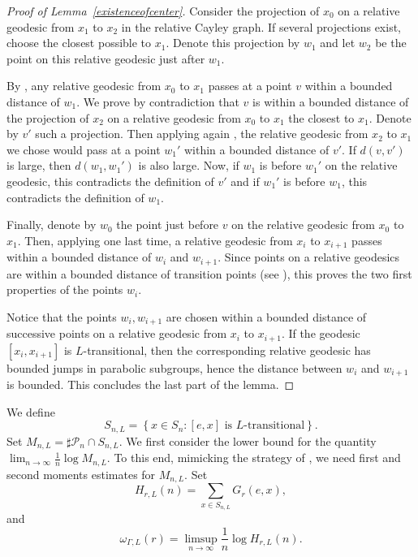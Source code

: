\documentclass{amsart}
\theoremstyle{definition}
\theoremstyle{remark}
\begin{document}
\begin{proof}[Proof of Lemma~\ref{existenceofcenter}]
Consider the projection of $x_0$ on a relative geodesic from $x_1$ to $x_2$ in the relative Cayley graph.
If several projections exist, choose the closest possible to $x_1$.
Denote this projection by $w_1$ and
let $w_2$ be the point on this relative geodesic just after $w_1$.

By \cite[Lemma~4.16]{DussauleLLT1}, any relative geodesic from $x_0$ to $x_1$ passes at a point $v$ within a bounded distance of $w_1$.
We prove by contradiction that $v$ is within a bounded distance of the projection of $x_2$ on a relative geodesic from $x_0$ to $x_1$ the closest to $x_1$.
Denote by $v'$ such a projection.
Then applying again \cite[Lemma~4.16]{DussauleLLT1}, the relative geodesic from $x_2$ to $x_1$ we chose would pass at a point $w_1'$ within a bounded distance of $v'$.
If $d(v,v')$ is large, then $d(w_1,w_1')$ is also large.
Now, if $w_1$ is before $w_1'$ on the relative geodesic, this contradicts the definition of $v'$ and if $w_1'$ is before $w_1$, this contradicts the definition of $w_1$.

Finally, denote by $w_0$ the point just before $v$ on the relative geodesic from $x_0$ to $x_1$.
Then, applying \cite[Lemma~4.16]{DussauleLLT1} one last time, a relative geodesic from $x_i$ to $x_{i+1}$ passes within a bounded distance of $w_i$ and $w_{i+1}$.
Since points on a relative geodesics are within a bounded distance of transition points (see \cite[Proposition~8.13]{Hruska}), this proves the two first properties of the points $w_i$.

Notice that the points $w_i,w_{i+1}$ are chosen within a bounded distance of successive points on a relative geodesic from $x_i$ to $x_{i+1}$.
If the geodesic $[x_i,x_{i+1}]$ is $L$-transitional, then the corresponding relative geodesic has bounded jumps in parabolic subgroups, hence the distance between $w_i$ and $w_{i+1}$ is bounded.
This concludes the last part of the lemma.
\end{proof}


We define
\[
  S_{n, L} = \left\{ x \in S_n \colon [e, x] \text{ is } L \text{-transitional} \right\}.  
\]
Set $M_{n, L} = \sharp \mathcal{P}_n \cap S_{n, L}$. 
We first consider the lower bound for the quantity $\lim_{n \to \infty} \frac{1}{n} \log M_{n, L}$. 
To this end, mimicking the strategy of \cite{SWX}, we need first and second moments estimates for $M_{n, L}$.  Set
\[
  H_{r, L}(n) = \sum_{x \in S_{n, L}} G_r(e, x), 
\]
and 
\[
  \omega_{\Gamma, L}(r) = \limsup_{n \to \infty} \frac{1}{n} \log H_{r, L}(n). 
\]
\end{document}
